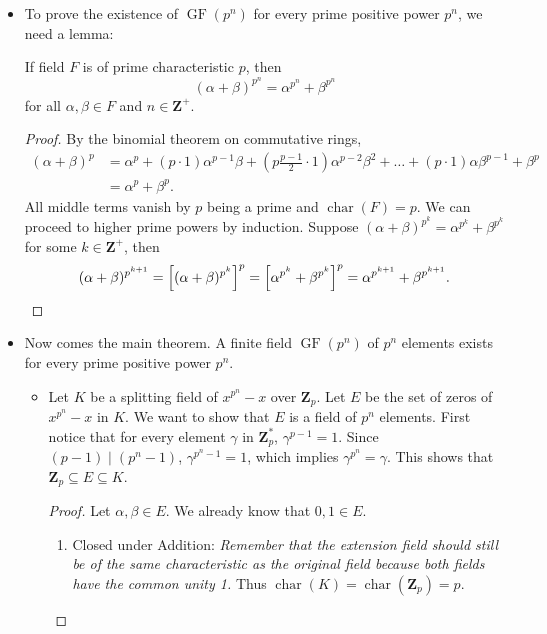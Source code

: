 \documentclass[11pt]{article}
\newcommand{\Z}{\mathbf{Z}}
\newcommand{\kar}{\operatorname{char}}
\newcommand{\GF}{\operatorname{GF}} %
\begin{document}
\begin{itemize}
\begin{proof}
        Since $x^{p^n}-x = x (x^{p^n-1} - 1)$, every nonzero root to $x^{p^n}-x$ is a root to $x^{p^n-1} - 1$. Say $\alpha \in K^*$ is a root to $x^{p^n-1} - 1$. Then by long division \[\frac{x^{p^n-1} - 1}{x-\alpha} = x^{p^n - 2}+\alpha x^{p^n - 3} + \alpha^2 x^{p^n - 4}+ \dots + \alpha^{p^n - 3}x + \alpha^{p^n - 2}.\] Call this polynomial $g(x)$, then \[g(\alpha) = (p^n-1)\alpha^{p^n - 2} = (p^n-1)\frac{1}{\alpha} = -\frac{1}{\alpha} \neq 0\] (by $\alpha^{p^n-1} - 1 = 0$ and $\kar(F)=p$). This shows that every zero $\alpha$ has multiplicity 1.
    \end{proof}
    \item To prove the existence of $\GF(p^n)$ for every prime positive power $p^n$, we need a lemma:
    
    If field $F$ is of prime characteristic $p$, then \[(\alpha + \beta)^{p^n} = \alpha^{p^n} + \beta^{p^n}\] for all $\alpha,\beta \in F$ and $n \in \Z^+$.
    \begin{proof}
        By the binomial theorem on commutative rings,
        \begin{align*}
            (\alpha + \beta)^p & = \alpha^p + (p \cdot 1) \alpha^{p-1}\beta + (p\frac{p-1}{2} \cdot 1)\alpha^{p-2}\beta^2 + \dots + (p \cdot 1) \alpha\beta^{p-1} + \beta^p \\ & = \alpha^p + \beta^p.
        \end{align*}
        All middle terms vanish by $p$ being a prime and $\kar(F) = p$. We can proceed to higher prime powers by induction. Suppose $(\alpha + \beta)^{p^k} = \alpha^{p^k} + \beta^{p^k}$ for some $k \in \Z^+$, then \[(\alpha + \beta)^{p^{k+1}} = \Bigl[(\alpha + \beta)^{p^k}\Bigr]^p = \Bigl[\alpha^{p^k} + \beta^{p^k}\Bigr]^p = \alpha^{p^{k+1}} + \beta^{p^{k+1}}.\qedhere\]
    \end{proof}
    \item Now comes the main theorem. A finite field $\GF(p^n)$ of $p^n$ elements exists for every prime positive power $p^n$. 
    \begin{itemize}
        \item Let $K$ be a splitting field of $x^{p^n} - x$ over $\Z_p$. Let $E$ be the set of zeros of $x^{p^n} - x$ in $K$. We want to show that $E$ is a field of $p^n$ elements. First notice that for every element $\gamma$ in $\Z_p^*$, $\gamma^{p-1} = 1$. Since $(p-1) \mid (p^n - 1)$, $\gamma^{p^n-1} = 1$, which implies $\gamma^{p^n} = \gamma$. This shows that $\Z_p \subseteq E \subseteq K$.
        \begin{proof}
            Let $\alpha,\beta \in E$. We already know that $0,1 \in E$.
        \begin{enumerate}[label=(\roman*)]
            \item Closed under Addition: \emph{Remember that the extension field should still be of the same characteristic as the original field because both fields have the common unity 1.} Thus $\kar(K) = \kar(\Z_p) = p$.
            

\end{enumerate}
\end{proof}
\end{itemize}
\end{itemize}
\end{document}
